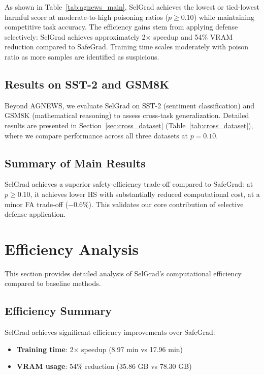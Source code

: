 As shown in Table~\ref{tab:agnews_main}, SelGrad achieves the lowest or tied-lowest harmful score at moderate-to-high poisoning ratios ($p \geq 0.10$) while maintaining competitive task accuracy. The efficiency gains stem from applying defense selectively: SelGrad achieves approximately 2$\times$ speedup and 54\% VRAM reduction compared to SafeGrad. Training time scales moderately with poison ratio as more samples are identified as suspicious.

\subsection{Results on SST-2 and GSM8K}
\label{subsec:other_datasets}

Beyond AGNEWS, we evaluate SelGrad on SST-2 (sentiment classification) and GSM8K (mathematical reasoning) to assess cross-task generalization. Detailed results are presented in Section~\ref{sec:cross_dataset} (Table~\ref{tab:cross_dataset}), where we compare performance across all three datasets at $p=0.10$.

\subsection{Summary of Main Results}
\label{subsec:main_summary}

SelGrad achieves a superior safety-efficiency trade-off compared to SafeGrad: at $p \geq 0.10$, it achieves lower HS with substantially reduced computational cost, at a minor FA trade-off ($-0.6\%$). This validates our core contribution of selective defense application.


\section{Efficiency Analysis}
\label{sec:efficiency}

This section provides detailed analysis of SelGrad's computational efficiency compared to baseline methods.

\subsection{Efficiency Summary}
\label{subsec:efficiency_summary}

SelGrad achieves significant efficiency improvements over SafeGrad:
\begin{itemize}
    \item \textbf{Training time}: 2$\times$ speedup (8.97 min vs 17.96 min)
    \item \textbf{VRAM usage}: 54\% reduction (35.86 GB vs 78.30 GB)
\end{itemize}

